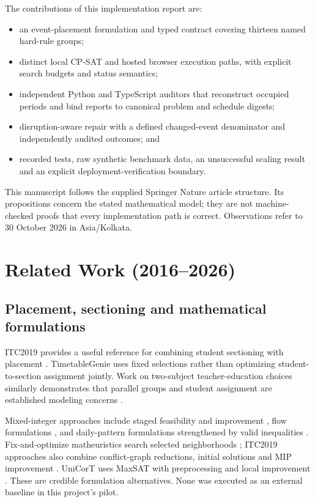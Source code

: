 \documentclass[pdflatex,sn-mathphys-num]{sn-jnl}
\theoremstyle{thmstyleone}
\theoremstyle{thmstyletwo}
\theoremstyle{thmstylethree}
\begin{document}
The contributions of this implementation report are:
\begin{itemize}
\item an event-placement formulation and typed contract covering thirteen named hard-rule groups;
\item distinct local CP-SAT and hosted browser execution paths, with explicit search budgets and status semantics;
\item independent Python and TypeScript auditors that reconstruct occupied periods and bind reports to canonical problem and schedule digests;
\item disruption-aware repair with a defined changed-event denominator and independently audited outcomes; and
\item recorded tests, raw synthetic benchmark data, an unsuccessful scaling result and an explicit deployment-verification boundary.
\end{itemize}

This manuscript follows the supplied Springer Nature article structure. Its propositions concern the stated mathematical model; they are not machine-checked proofs that every implementation path is correct. Observations refer to 30 October 2026 in Asia/Kolkata.

\section{Related Work (2016--2026)}\label{sec:related}

\subsection{Placement, sectioning and mathematical formulations}

ITC2019 provides a useful reference for combining student sectioning with placement \cite{P01,P02}. TimetableGenie uses fixed selections rather than optimizing student-to-section assignment jointly. Work on two-subject teacher-education choices similarly demonstrates that parallel groups and student assignment are established modeling concerns \cite{P22}.

Mixed-integer approaches include staged feasibility and improvement \cite{P03}, flow formulations \cite{P04}, and daily-pattern formulations strengthened by valid inequalities \cite{P10}. Fix-and-optimize matheuristics search selected neighborhoods \cite{P05}; ITC2019 approaches also combine conflict-graph reductions, initial solutions and MIP improvement \cite{P23}. UniCorT uses MaxSAT with preprocessing and local improvement \cite{P09}. These are credible formulation alternatives. None was executed as an external baseline in this project's pilot.
\end{document}
